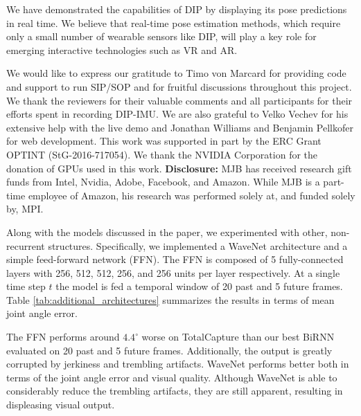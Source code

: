 \documentclass[acmtog]{acmart}
\begin{document}
We have demonstrated the capabilities of DIP by displaying its pose predictions in real time. We believe that real-time pose estimation methods, which require only a small number of wearable sensors like DIP, will play a key role for emerging interactive technologies such as VR and AR.

\begin{acks}
We would like to express our gratitude to Timo von Marcard for providing code and support to run SIP/SOP and for fruitful discussions throughout this project. We thank the reviewers for their valuable comments and all participants for their efforts spent in recording DIP-IMU. We are also grateful to Velko Vechev for his extensive help with the live demo and Jonathan Williams and Benjamin Pellkofer for web development. This work was supported in part by the ERC Grant OPTINT (StG-2016-717054). We thank the NVIDIA Corporation for the donation of GPUs used in this work.
\textbf{Disclosure:} MJB has received research gift funds from Intel, Nvidia, Adobe, Facebook, and Amazon.  While MJB is a part-time employee of Amazon, his research was performed solely at, and funded solely by, MPI.
\end{acks}




Along with the models discussed in the paper, we experimented with other, non-recurrent structures. Specifically, we implemented a WaveNet architecture \cite{oord2016wavenet} and a simple feed-forward network (FFN). The FFN is composed of 5 fully-connected layers with 256, 512, 512, 256, and 256 units per layer respectively. At a single time step $t$ the model is fed a temporal window of 20 past and 5 future frames. Table \ref{tab:additional_architectures} summarizes the results in terms of mean joint angle error.

The FFN performs around $4.4^\circ$ worse on TotalCapture than our best BiRNN evaluated on 20 past and 5 future frames. Additionally, the output is greatly corrupted by jerkiness and trembling artifacts. WaveNet performs better both in terms of the joint angle error and visual quality. Although WaveNet is able to considerably reduce the trembling artifacts, they are still apparent, resulting in displeasing visual output.
\end{document}
